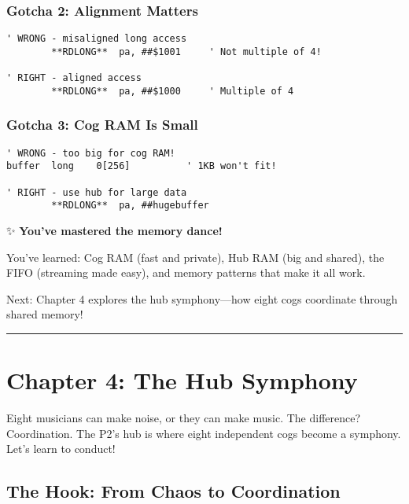 \documentclass[11pt]{book}
\begin{document}
\hypertarget{gotcha-2-alignment-matters}{%
\subsubsection{Gotcha 2: Alignment
Matters}\label{gotcha-2-alignment-matters}}

\begin{lstlisting}
' WRONG - misaligned long access
        **RDLONG**  pa, ##$1001     ' Not multiple of 4!
        
' RIGHT - aligned access
        **RDLONG**  pa, ##$1000     ' Multiple of 4
\end{lstlisting}

\hypertarget{gotcha-3-cog-ram-is-small}{%
\subsubsection{Gotcha 3: Cog RAM Is
Small}\label{gotcha-3-cog-ram-is-small}}

\begin{lstlisting}
' WRONG - too big for cog RAM!
buffer  long    0[256]          ' 1KB won't fit!

' RIGHT - use hub for large data
        **RDLONG**  pa, ##hugebuffer
\end{lstlisting}

\begin{chapterend}
✨ \textbf{You've mastered the memory dance!}

You've learned: Cog RAM (fast and private), Hub RAM (big and shared), the FIFO (streaming made easy), and memory patterns that make it all work.

Next: Chapter 4 explores the hub symphony—how eight cogs coordinate through shared memory!
\end{chapterend}

\begin{center}\rule{0.5\linewidth}{0.5pt}\end{center}

\hypertarget{chapter-4-the-hub-symphony}{%
\section{Chapter 4: The Hub Symphony}\label{chapter-4-the-hub-symphony}}

Eight musicians can make noise, or they can make music. The difference?
Coordination. The P2's hub is where eight independent cogs become a
symphony. Let's learn to conduct!

\hypertarget{the-hook-from-chaos-to-coordination}{%
\subsection{The Hook: From Chaos to
Coordination}\label{the-hook-from-chaos-to-coordination}}
\end{document}
